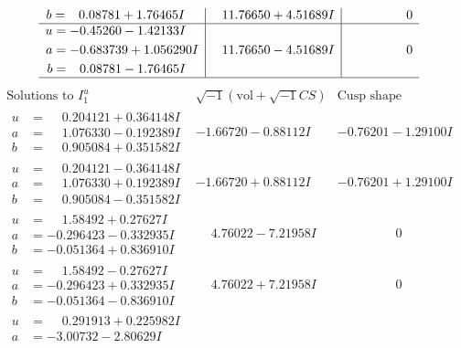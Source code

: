 \documentclass[1p]{elsarticle_modified}
\theoremstyle{definition}
\newcommand{\I}{\sqrt{-1}}
\begin{document}
$$\begin{array}{c|c|c}
\begin{aligned}
b &= \phantom{-}0.08781 + 1.76465 I\end{aligned}
 & \phantom{-}11.76650 + 4.51689 I & \phantom{-0.000000 } 0 \\ \hline\begin{aligned}
u &= -0.45260 - 1.42133 I \\
a &= -0.683739 + 1.056290 I \\
b &= \phantom{-}0.08781 - 1.76465 I\end{aligned}
 & \phantom{-}11.76650 - 4.51689 I & \phantom{-0.000000 } 0\\
 \hline 
 \end{array}$$\newpage$$\begin{array}{c|c|c}  
\text{Solutions to }I^u_{1}& \I (\text{vol} + \sqrt{-1}CS) & \text{Cusp shape}\\
 \hline 
\begin{aligned}
u &= \phantom{-}0.204121 + 0.364148 I \\
a &= \phantom{-}1.076330 - 0.192389 I \\
b &= \phantom{-}0.905084 + 0.351582 I\end{aligned}
 & -1.66720 - 0.88112 I & -0.76201 - 1.29100 I \\ \hline\begin{aligned}
u &= \phantom{-}0.204121 - 0.364148 I \\
a &= \phantom{-}1.076330 + 0.192389 I \\
b &= \phantom{-}0.905084 - 0.351582 I\end{aligned}
 & -1.66720 + 0.88112 I & -0.76201 + 1.29100 I \\ \hline\begin{aligned}
u &= \phantom{-}1.58492 + 0.27627 I \\
a &= -0.296423 - 0.332935 I \\
b &= -0.051364 + 0.836910 I\end{aligned}
 & \phantom{-}4.76022 - 7.21958 I & \phantom{-0.000000 } 0 \\ \hline\begin{aligned}
u &= \phantom{-}1.58492 - 0.27627 I \\
a &= -0.296423 + 0.332935 I \\
b &= -0.051364 - 0.836910 I\end{aligned}
 & \phantom{-}4.76022 + 7.21958 I & \phantom{-0.000000 } 0 \\ \hline\begin{aligned}
u &= \phantom{-}0.291913 + 0.225982 I \\
a &= -3.00732 - 2.80629 I \\

\end{aligned}
\end{array}$$
\end{document}
